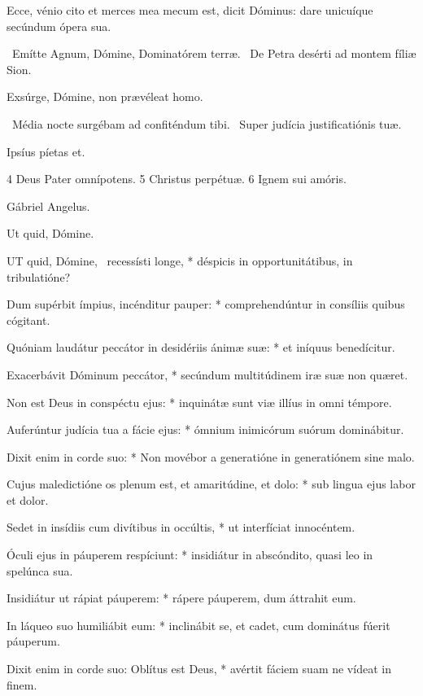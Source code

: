   Ecce, vénio cito et merces mea mecum est, dicit Dóminus: dare unicuíque secúndum ópera sua.

\V\ Emítte Agnum, Dómine, Dominatórem terræ. \R\ De Petra desérti ad montem fíliæ Sion.

  Exsúrge, Dómine, non prævéleat homo.

\V\ Média nocte surgébam ad confiténdum tibi. \R\ Super judícia justificatiónis tuæ.

 Ipsíus píetas et.

 4 Deus Pater omnípotens. 5 Christus perpétuæ. 6 Ignem sui amóris.


  Gábriel Angelus.

  Ut quid, Dómine. \textdagger


\lettrine[lines=2]{U}{T} quid, Dómine, \textdagger\ recessísti longe, * déspicis in opportunitátibus, in tribulatióne?

Dum supérbit ímpius, incénditur pauper: * comprehendúntur in consíliis quibus cógitant.

Quóniam laudátur peccátor in desidériis ánimæ suæ: * et iníquus benedícitur.

Exacerbávit Dóminum peccátor, * secúndum multitúdinem iræ suæ non quæret.

Non est Deus in conspéctu ejus: * inquinátæ sunt viæ illíus in omni témpore.

Auferúntur judícia tua a fácie ejus: * ómnium inimicórum suórum dominábitur.

Dixit enim in corde suo: * Non movébor a generatióne in generatiónem sine malo.

Cujus maledictióne os plenum est, et amaritúdine, et dolo: * sub lingua ejus labor et dolor.

Sedet in insídiis cum divítibus in occúltis, * ut interfíciat innocéntem.

Óculi ejus in páuperem respíciunt: * insidiátur in abscóndito, quasi leo in spelúnca sua.

Insidiátur ut rápiat páuperem: * rápere páuperem, dum áttrahit eum.

In láqueo suo humiliábit eum: * inclinábit se, et cadet, cum dominátus fúerit páuperum.

Dixit enim in corde suo: Oblítus est Deus, * avértit fáciem suam ne vídeat in finem.

